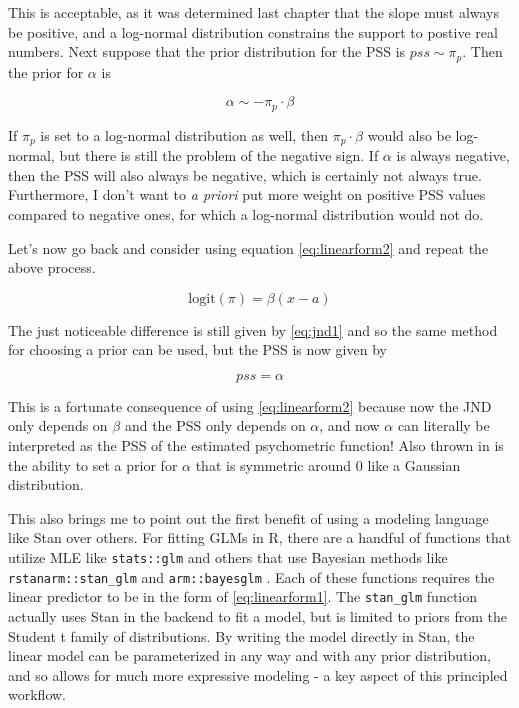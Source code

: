 \documentclass[11pt, oneside, openany]{scrbook}
\begin{document}
This is acceptable, as it was determined last chapter that the slope must always be positive, and a log-normal distribution constrains the support to postive real numbers. Next suppose that the prior distribution for the PSS is \(pss \sim \pi_p\). Then the prior for \(\alpha\) is


\[
\alpha \sim -\pi_p \cdot \beta
\]

If \(\pi_p\) is set to a log-normal distribution as well, then \(\pi_p \cdot \beta\) would also be log-normal, but there is still the problem of the negative sign. If \(\alpha\) is always negative, then the PSS will also always be negative, which is certainly not always true. Furthermore, I don't want to \emph{a priori} put more weight on positive PSS values compared to negative ones, for which a log-normal distribution would not do.

Let's now go back and consider using equation \eqref{eq:linearform2} and repeat the above process.


\begin{equation}
  \mathrm{logit}(\pi) = \beta(x - a)
  \label{eq:pfform2}
\end{equation}

The just noticeable difference is still given by \eqref{eq:jnd1} and so the same method for choosing a prior can be used, but the PSS is now given by


\[
pss = \alpha
\]

This is a fortunate consequence of using \eqref{eq:linearform2} because now the JND only depends on \(\beta\) and the PSS only depends on \(\alpha\), and now \(\alpha\) can literally be interpreted as the PSS of the estimated psychometric function! Also thrown in is the ability to set a prior for \(\alpha\) that is symmetric around \(0\) like a Gaussian distribution.

This also brings me to point out the first benefit of using a modeling language like Stan over others. For fitting GLMs in R, there are a handful of functions that utilize MLE like \texttt{stats::glm} and others that use Bayesian methods like \texttt{rstanarm::stan\_glm} and \texttt{arm::bayesglm} \citep{R-rstanarm, R-arm}. Each of these functions requires the linear predictor to be in the form of \eqref{eq:linearform1}. The \texttt{stan\_glm} function actually uses Stan in the backend to fit a model, but is limited to priors from the Student t family of distributions. By writing the model directly in Stan, the linear model can be parameterized in any way and with any prior distribution, and so allows for much more expressive modeling - a key aspect of this principled workflow.
\end{document}
